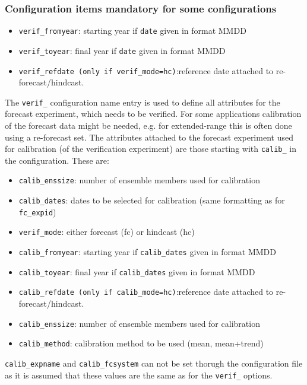 \documentclass[DIV=10, parskip=full]{scrreprt}
\begin{document}
\subsubsection{Configuration items mandatory for some configurations}
\begin{itemize}
	\item \texttt{verif\_fromyear}: starting year if \texttt{date} given in format MMDD
	\item \texttt{verif\_toyear}: final year if \texttt{date} given in format MMDD
	\item \texttt{verif\_refdate (only if \texttt{verif\_mode=hc})}:reference date attached to re-forecast/hindcast. 
\end{itemize}
The \texttt{verif\_} configuration name entry is used to define all attributes for the forecast experiment, which needs to be verified. For some applications calibration of the forecast data might be needed, e.g. for extended-range this is often done using a re-forecast set. The attributes attached to the forecast experiment used for calibration (of the verification experiment) are those starting with  \texttt{calib\_} in the configuration. These are:
\begin{itemize}
	\item \texttt{calib\_enssize}: number of ensemble members used for calibration 
	\item \texttt{calib\_dates}: dates to be selected for calibration (same formatting as for \texttt{fc\_expid})
	\item \texttt{verif\_mode}: either forecast (fc) or hindcast (hc)
	\item \texttt{calib\_fromyear}: starting year if \texttt{calib\_dates} given in format MMDD
	\item \texttt{calib\_toyear}: final year if \texttt{calib\_dates} given in format MMDD
	\item \texttt{calib\_refdate (only if \texttt{calib\_mode=hc})}:reference date attached to re-forecast/hindcast. 
	\item \texttt{calib\_enssize}: number of ensemble members used for calibration 
	\item \texttt{calib\_method}: calibration method to be used (mean, mean+trend)
\end{itemize}

\texttt{calib\_expname} and \texttt{calib\_fcsystem} can not be set thorugh the configuration file as it is assumed that these values are the same as for the \texttt{verif\_} options. 
\end{document}
